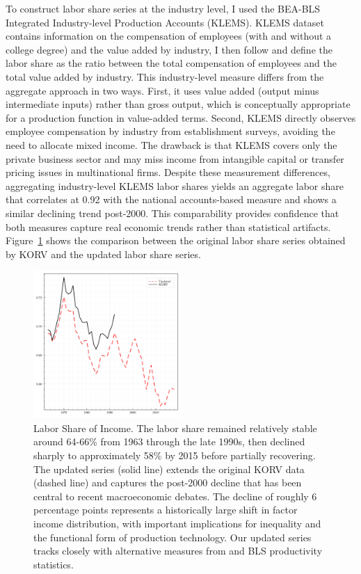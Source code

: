 \documentclass[12pt]{article}
\begin{document}
To construct labor share series at the industry level, I used the BEA-BLS Integrated Industry-level Production Accounts (KLEMS). KLEMS dataset contains information on the compensation of employees (with and without a college degree) and the value added by industry, I then follow \citep{karabarbounis2014global} and define the labor share as the ratio between the total compensation of employees and the total value added by industry. This industry-level measure differs from the aggregate approach in two ways. First, it uses value added (output minus intermediate inputs) rather than gross output, which is conceptually appropriate for a production function in value-added terms. Second, KLEMS directly observes employee compensation by industry from establishment surveys, avoiding the need to allocate mixed income. The drawback is that KLEMS covers only the private business sector and may miss income from intangible capital or transfer pricing issues in multinational firms. Despite these measurement differences, aggregating industry-level KLEMS labor shares yields an aggregate labor share that correlates at 0.92 with the national accounts-based measure and shows a similar declining trend post-2000. This comparability provides confidence that both measures capture real economic trends rather than statistical artifacts. Figure~\ref{fig:labor_share_updated} shows the comparison between the original labor share series obtained by KORV and the updated labor share series.

\begin{figure}%
\centering
\includegraphics[width=0.5\textwidth]{../images/fig:labor_share_updated.pdf}
\caption{\label{fig:labor_share_updated} Labor Share of Income. The labor share remained relatively stable around 64-66\% from 1963 through the late 1990s, then declined sharply to approximately 58\% by 2015 before partially recovering. The updated series (solid line) extends the original KORV data (dashed line) and captures the post-2000 decline that has been central to recent macroeconomic debates. The decline of roughly 6 percentage points represents a historically large shift in factor income distribution, with important implications for inequality and the functional form of production technology. Our updated series tracks closely with alternative measures from \citet{karabarbounis2014global} and BLS productivity statistics.}
\end{figure}
\end{document}
